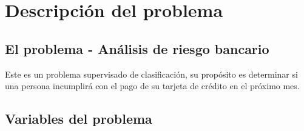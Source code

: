 \documentclass[conference]{IEEEtran}
\begin{document}
\section{Descripción del problema}

\subsection{El problema - Análisis de riesgo bancario}
Este es un problema supervisado de clasificación, su propósito es determinar si una persona incumplirá con el pago de su tarjeta de crédito en el próximo mes.

\subsection{Variables del problema}
\end{document}

